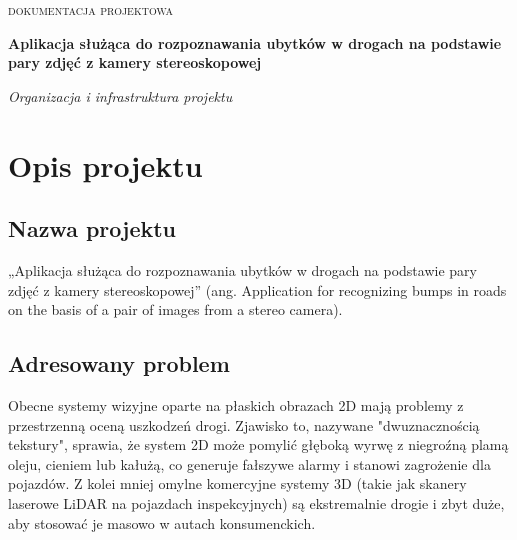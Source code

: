 \documentclass[11pt, a4paper]{article}
\newcommand{\FullTitle}{Aplikacja służąca do rozpoznawania ubytków w drogach na podstawie pary zdjęć z kamery stereoskopowej}
\newcommand{\DocType}{Organizacja i infrastruktura projektu}
\begin{document}
\begin{titlepage}
    \centering
    
    \vspace*{2cm}
    
    {\scshape\Large dokumentacja projektowa \par}
    \vspace{1.5cm}
    
    {\Huge\bfseries\textcolor{ProjectColor}{\FullTitle} \par}
    \vspace{2cm}
    
    {\Large\itshape \DocType \par}
    \vspace{2cm}
    
    \vfill
    
\end{titlepage}

\newpage

\section{Opis projektu}
\subsection{Nazwa projektu}
„Aplikacja służąca do rozpoznawania ubytków w drogach na podstawie pary zdjęć z kamery stereoskopowej” (ang. Application for recognizing bumps in roads on the basis of a pair of images from a stereo camera).

\subsection{Adresowany problem}
Obecne systemy wizyjne oparte na płaskich obrazach 2D mają problemy z przestrzenną oceną uszkodzeń drogi. Zjawisko to, nazywane "dwuznacznością tekstury", sprawia, że system 2D może pomylić głęboką wyrwę z niegroźną plamą oleju, cieniem lub kałużą, co generuje fałszywe alarmy i stanowi zagrożenie dla pojazdów. Z kolei mniej omylne komercyjne systemy 3D (takie jak skanery laserowe LiDAR na pojazdach inspekcyjnych) są ekstremalnie drogie i zbyt duże, aby stosować je masowo w autach konsumenckich.
\end{document}
